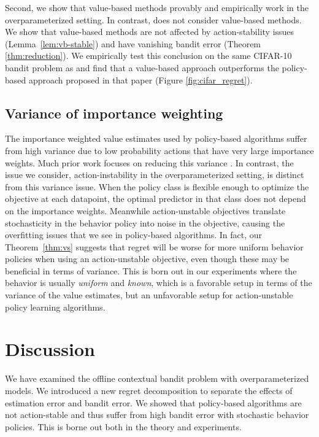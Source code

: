 Second, we show that value-based methods provably and empirically work in the overparameterized setting. In contrast, \citet{joachims2018deep} does not consider value-based methods. We show that value-based methods are not affected by action-stability issues (Lemma~\ref{lem:vb-stable}) and have vanishing bandit error (Theorem \ref{thm:reduction}). We empirically test this conclusion on the same CIFAR-10 bandit problem as \citet{joachims2018deep} and find that a value-based approach outperforms the policy-based approach proposed in that paper (Figure \ref{fig:cifar_regret}).

\subsection{Variance of importance weighting}

The importance weighted value estimates used by policy-based algorithms suffer from high variance due to low probability actions that have very large importance weights.
Much prior work focuses on reducing this variance \cite{strehl2010learning, bottou2013counterfactual, swaminathan2015counterfactual}.
In contrast, the issue we consider, action-instability in the overparameterized setting, is distinct from this variance issue.
When the policy class is flexible enough to optimize the objective at each datapoint, the optimal predictor in that class does not depend on the importance weights.
Meanwhile action-unstable objectives translate stochasticity in the behavior policy into noise in the objective, causing the overfitting issues that we see in policy-based algorithms.
In fact, our Theorem~\ref{thm:vs} suggests that regret will be worse for more uniform behavior policies when using an action-unstable objective, even though these may be beneficial in terms of variance.
This is born out in our experiments where the behavior is usually \emph{uniform} and \emph{known}, which is a favorable setup in terms of the variance of the value estimates, but an unfavorable setup for action-unstable policy learning algorithms.


\section{Discussion}
We have examined the offline contextual bandit problem with overparameterized models. We introduced a new regret decomposition to separate the effects of estimation error and bandit error. We showed that policy-based algorithms are not action-stable and thus suffer from high bandit error with stochastic behavior policies.
This is borne out both in the theory and experiments.


